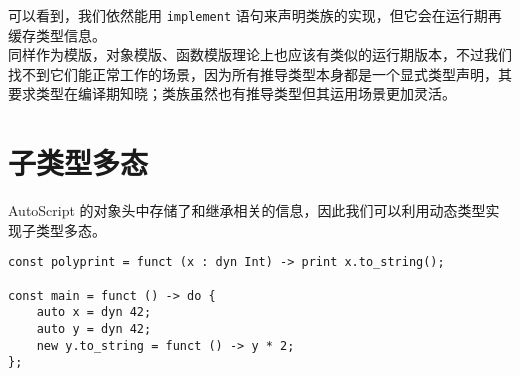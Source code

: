 可以看到，我们依然能用 \lstinline!implement! 语句来声明类族的实现，但它会在运行期再缓存类型信息。 \\

同样作为模版，对象模版、函数模版理论上也应该有类似的运行期版本，不过我们找不到它们能正常工作的场景，因为所有推导类型本身都是一个显式类型声明，其要求类型在编译期知晓；类族虽然也有推导类型但其运用场景更加灵活。


\section{子类型多态}

AutoScript 的对象头中存储了和继承相关的信息，因此我们可以利用动态类型实现子类型多态。

\begin{lstlisting}
const polyprint = funct (x : dyn Int) -> print x.to_string();

const main = funct () -> do {
	auto x = dyn 42;
	auto y = dyn 42;
	new y.to_string = funct () -> y * 2;
};
\end{lstlisting}